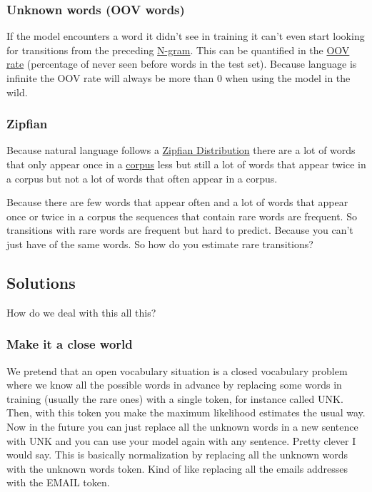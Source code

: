 \documentclass[
  11pt,
  british,
]{article}
\begin{document}
\hypertarget{unknown-words-oov-words}{%
\subsubsection{Unknown words (OOV
words)}\label{unknown-words-oov-words}}

If the model encounters a word it didn't see in training it can't even
start looking for transitions from the preceding
\href{../Languages/N-grams.md}{N-gram}. This can be quantified in the
\href{OOV\%20rate.md}{OOV rate} (percentage of never seen before words
in the test set). Because language is infinite the OOV rate will always
be more than 0 when using the model in the wild.

\hypertarget{zipfian}{%
\subsubsection{Zipfian}\label{zipfian}}

Because natural language follows a
\href{../Languages/Zipfian\%20Distribution.md}{Zipfian Distribution}
there are a lot of words that only appear once in a
\href{../Data/Corpus.md}{corpus} less but still a lot of words that
appear twice in a corpus but not a lot of words that often appear in a
corpus.

Because there are few words that appear often and a lot of words that
appear once or twice in a corpus the sequences that contain rare words
are frequent. So transitions with rare words are frequent but hard to
predict. Because you can't just have of the same words. So how do you
estimate rare transitions?

\hypertarget{solutions}{%
\subsection{Solutions}\label{solutions}}

How do we deal with this all this?

\hypertarget{make-it-a-close-world}{%
\subsubsection{Make it a close world}\label{make-it-a-close-world}}

We pretend that an open vocabulary situation is a closed vocabulary
problem where we know all the possible words in advance by replacing
some words in training (usually the rare ones) with a single token, for
instance called \textbar UNK\textbar. Then, with this token you make the
maximum likelihood estimates the usual way. Now in the future you can
just replace all the unknown words in a new sentence with
\textbar UNK\textbar{} and you can use your model again with any
sentence. Pretty clever I would say. This is basically normalization by
replacing all the unknown words with the unknown words token. Kind of
like replacing all the emails addresses with the EMAIL token.
\end{document}
